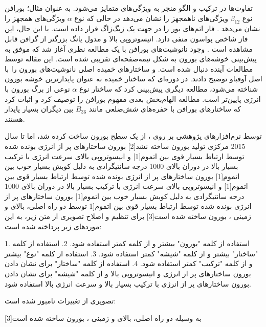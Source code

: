 تفاوت‌ها در ترکیب و الگو منجر به ویژگی‌های متمایز می‌شود. به عنوان مثال؛ بورافن نوع $\beta_{12}$ ویژگی‌های ناهمجهز را نشان می‌دهد  در حالی که نوع $\alpha$ ویژگی‌های همجهز را نشان می‌دهد . فاز  اتم‌های بور را در جهت یک زیگ‌زاگ قرار داده است. با این حال، این فاز شاخص پواسون منفی دارد. انیسوتروپی بالا و مدول یانگ بزرگتر از گرافن قابل مشاهده است . وجود نانوشیت‌های بورافن با یک مطالعه نظری آغاز شد  که موفق به پیش‌بینی خوشه‌های بورون به شکل نیمه‌صفحه‌ای تقریبی شده است. این مقاله توسط مطالعات آینده دنبال شده است.  و  ساختارهای خمیده اصلی نانوشیت‌های بورون  را با اصل آوفباو توضیح دادند. در دوره‌ای که ساختار خمیده به عنوان پایدارترین خوشه بورون شناخته می‌شود، مطالعه دیگری  پیش‌بینی کرد که ساختار نوع $\alpha$ نوعی از برگ بورون با انرژی پایین‌تر است. مطالعه الهام‌بخش بعدی  مفهوم بورافن را توصیف کرد و اثبات کرد که ساختارهای بورافن با حفره‌های شش‌ضلعی مانند $B_{36}$ بین دیگران بسیار پایدار هستند.

توسط نرم‌افزارهای پژوهشی بر روی ، از یک سطح بورون ساخت کرده شد، اما تا سال 2015 مرکزی تولید بورون ساخته نشد[2] بورون ساختارهای پر از انرژی بونده شده توسط ارتباط بسیار قوی بین اتموم[1] و انیسوتروپی بالای سرعت انرژی با ترکیب بسیار بالا در دوران بالای 1000 درجه سانتیگرادی به دلیل کوبش بسیار خوب بین اتموم[1] بورون ساختارهای پر از انرژی بونده شده توسط ارتباط بسیار قوی بین اتموم[1] و انیسوتروپی بالای سرعت انرژی با ترکیب بسیار بالا در دوران بالای 1000 درجه سانتیگرادی به دلیل کوبش بسیار خوب بین اتموم[1] بورون ساختارهای پر از انرژی بونده شده توسط ارتباط بسیار قوی بین اتموم[1 توسط دو راه اصلی، بالای و زمینی ، بورون ساخته شده است[3] برای تنظیم و اصلاح تصویری از متن زیر، به این موردهای زیر پرداخته شده است:

1. استفاده از کلمه "بورون" بیشتر و از کلمه  کمتر استفاده شود.
2. استفاده از کلمه "ساختار" بیشتر و از کلمه "شیشه" کمتر استفاده شود.
3. استفاده از کلمه "نوع" بیشتر و از کلمه "ترکیب" کمتر استفاده شود.
4. استفاده از کلمه "ساختار" برای نشان دادن بورون ساختارهای پر از انرژی و انیسوتروپی بالا و از کلمه "شیشه" برای نشان دادن بورون ساختارهای پر از انرژی با ترکیب بسیار بالا و سرعت انرژی بالا استفاده شود.

تصویری از تغییرات نامبوز شده است:

به وسیله دو راه اصلی، بالای و زمینی ، بورون ساخته شده است[3]

